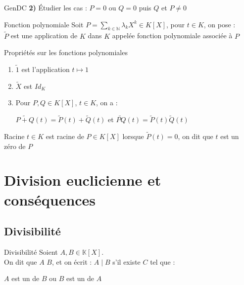 \documentclass[12pt,a4paper]{report}
\begin{document}
        \begin{principedemo}{GenDC}
        \textbf{2)} Étudier les cas : $P=0$ ou $Q=0$ puis $Q$ et $P\neq 0$
        \end{principedemo}
        
        
        \begin{definition}{Fonction polynomiale}{}
        Soit $P=\sum_{k\in \mathbb{N}} \lambda_{k} X^{k} \in K[X]$, pour $t \in K$, on pose : \\
        $\widetilde{P}$ est une application de $K$ dans $K$ appelée fonction polynomiale associée à $P$
        \end{definition}
        
        
        \begin{propositions}{Propriétés sur les fonctions polynomiales}{}
        \begin{enumerate}
        \item $\widetilde{1}$ est l'application $t \mapsto 1$
        \item $\widetilde{X}$ est $Id_{K}$
        \item Pour $P,Q \in K[X]$, $t\in K$, on a :
        \begin{center}
            $\widetilde{P+Q} (t)=\widetilde{P} (t)+\widetilde{Q} (t)$ et $\widetilde{PQ}(t)= \widetilde{P}(t)\widetilde{Q}(t)$
        \end{center}
        \end{enumerate}
        \end{propositions}
        
        \begin{definition}{Racine}{}
        $t \in K$ est racine de $P \in K[X]$ lorsque $\widetilde{P}(t)=0$, on dit que $t$ est un zéro de $P$
        \end{definition}
   

\section{Division euclicienne et conséquences}
    \subsection{Divisibilité}
    
        \begin{definition}{Divisibilité}{}
        Soient $A, B \in \mathbb{K}[X]$. \\
        On dit que $A$  $B$, et on écrit : $A\mid B$ s'il existe $C$ tel que :
        \begin{center}
        \end{center}
        $A$ est un  de $B$ ou $B$ est un  de $A$
        \end{definition}
    
\end{document}
